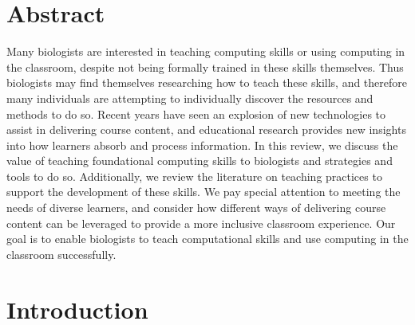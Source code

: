 

\section{Abstract}\label{sect:Abstract}

Many biologists are interested in teaching computing skills or using computing in the classroom, despite not being formally trained in these skills themselves.
Thus biologists may find themselves researching how to teach these skills,
and therefore many individuals are attempting to individually discover the resources and methods to do so.
Recent years have seen an explosion of new technologies to assist in delivering course content,
and educational research provides new insights into how learners absorb and process information.
In this review, we discuss the value of teaching foundational computing skills to biologists and 
strategies and tools to do so.
Additionally, we review the literature on teaching practices to support the development of these skills.
We pay special attention to meeting the needs of diverse learners, and consider how different ways of delivering course content can be leveraged to provide a more inclusive classroom experience.
Our goal is to enable biologists to teach computational skills and use computing in the classroom successfully.

\bigskip


\bigskip
\section{Introduction}\label{sect:Introduction}

